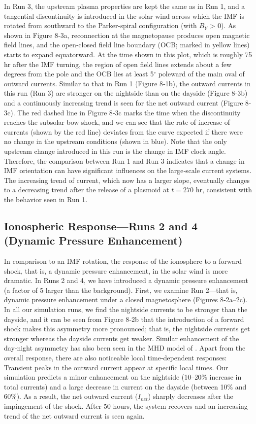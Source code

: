 In Run 3, the upstream plasma properties are kept the same as in Run 1, and a tangential discontinuity is introduced in the solar wind across which the IMF is rotated from southward to the Parker‐spiral configuration (with $B_Y$ > 0). As shown in Figure 8‐3a, reconnection at the magnetopause produces open magnetic field lines, and the open‐closed field line boundary (OCB; marked in yellow lines) starts to expand equatorward. At the time shown in this plot, which is roughly 75 hr after the IMF turning, the region of open field lines extends about a few degrees from the pole and the OCB lies at least 5$^\circ$ poleward of the main oval of outward currents. Similar to that in Run 1 (Figure 8‐1b), the outward currents in this run (Run 3) are stronger on the nightside than on the dayside (Figure 8‐3b) and a continuously increasing trend is seen for the net outward current (Figure 8‐3c). The red dashed line in Figure 8‐3c marks the time when the discontinuity reaches the subsolar bow shock, and we can see that the rate of increase of currents (shown by the red line) deviates from the curve expected if there were no change in the upstream conditions (shown in blue). Note that the only upstream change introduced in this run is the change in IMF clock angle. Therefore, the comparison between Run 1 and Run 3 indicates that a change in IMF orientation can have significant influences on the large‐scale current systems. The increasing trend of current, which now has a larger slope, eventually changes to a decreasing trend after the release of a plasmoid at $t = 270$ hr, consistent with the behavior seen in Run 1. 

\subsection{Ionospheric Response—Runs 2 and 4 (Dynamic Pressure Enhancement)}

In comparison to an IMF rotation, the response of the ionosphere to a forward shock, that is, a dynamic pressure enhancement, in the solar wind is more dramatic. In Runs 2 and 4, we have introduced a dynamic pressure enhancement (a factor of 5 larger than the background). First, we examine Run 2—that is, dynamic pressure enhancement under a closed magnetosphere (Figures 8‐2a–2c). In all our simulation runs, we find the nightside currents to be stronger than the dayside, and it can be seen from Figure 8‐2b that the introduction of a forward shock makes this asymmetry more pronounced; that is, the nightside currents get stronger whereas the dayside currents get weaker. Similar enhancement of the day‐night asymmetry has also been seen in the MHD model of \cite{Chane2017a}. Apart from the overall response, there are also noticeable local time‐dependent responses: Transient peaks in the outward current appear at specific local times. Our simulation predicts a minor enhancement on the nightside (10–20\% increase in total currents) and a large decrease in current on the dayside (between 10\% and 60\%). As a result, the net outward current ($I_{net}$) sharply decreases after the impingement of the shock. After 50 hours, the system recovers and an increasing trend of the net outward current is seen again. 

